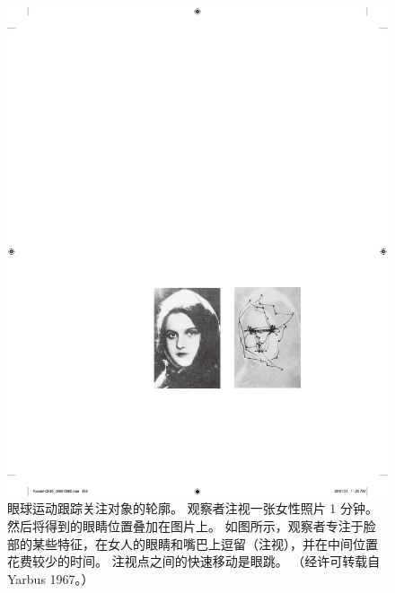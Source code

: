 \begin{figure}[htbp]
	\centering
	\includegraphics[width=0.4\linewidth]{chap35/fig_35_5}
	\caption{眼球运动跟踪关注对象的轮廓。 观察者注视一张女性照片 1 分钟。 然后将得到的眼睛位置叠加在图片上。 如图所示，观察者专注于脸部的某些特征，在女人的眼睛和嘴巴上逗留（注视），并在中间位置花费较少的时间。 注视点之间的快速移动是眼跳。 （经许可转载自 Yarbus 1967。）}
	\label{fig:35_5}
\end{figure}


